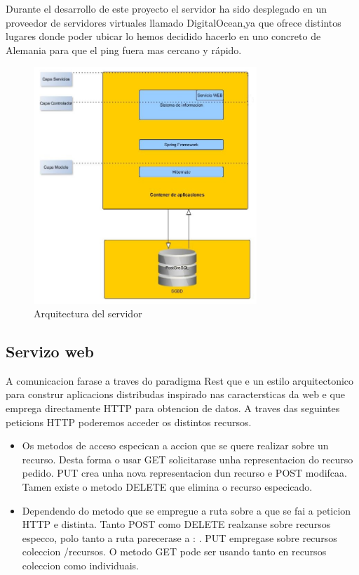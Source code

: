 Durante el desarrollo  de este proyecto el servidor ha sido desplegado en un proveedor de servidores virtuales llamado 
  DigitalOcean,ya que ofrece distintos lugares donde poder ubicar lo hemos decidido hacerlo en uno concreto de Alemania para que el ping fuera mas cercano y rápido.
\begin{figure}[H]
		\centering
		\includegraphics[width=0.75\textwidth] {arquitectura-servidor.jpg}
		\caption{Arquitectura del servidor }
	\end{figure}


\subsection{Servizo web}
A comunicacion farase a traves do paradigma Rest que e un estilo arquitectonico para
construr aplicacions distribudas inspirado nas caractersticas da web e que emprega
directamente HTTP para obtencion de datos. A traves das seguintes peticions HTTP
poderemos acceder os distintos recursos.


\begin{itemize}
\item Os metodos de acceso especican a accion que se quere realizar sobre un recurso. Desta
forma o usar GET solicitarase unha representacion do recurso pedido. PUT crea
unha nova representacion dun recurso e POST modifcaa. Tamen existe o metodo
DELETE que elimina o recurso especicado.
\item Dependendo do metodo que se empregue a ruta sobre a que se fai a peticion HTTP
e distinta. Tanto POST como DELETE realzanse sobre recursos especco, polo tanto
a ruta parecerase a : . PUT empregase sobre recursos
coleccion /recursos. O metodo GET pode ser usando tanto en recursos coleccion
como individuais.


\end{itemize}


